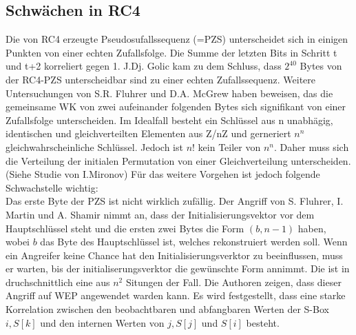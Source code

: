\documentclass[10pt,a4paper]{article}
\begin{document}
\subsection{Schwächen in RC4}
Die von RC4 erzeugte Pseudosufallssequenz (=PZS) unterscheidet sich in einigen Punkten von einer echten Zufallsfolge. Die Summe der letzten Bits in Schritt t und t+2 korreliert gegen 1.
J.Dj. Golic kam zu dem Schluss, dass $2^40$ Bytes von der RC4-PZS unterscheidbar sind zu einer echten Zufallssequenz.
Weitere Untersuchungen von S.R. Fluhrer und D.A. McGrew haben beweisen, das die gemeinsame WK von zwei aufeinander folgenden Bytes sich signifikant von einer Zufallsfolge unterscheiden. Im Idealfall besteht ein Schlüssel aus n unabhägig, identischen und gleichverteilten Elementen aus Z/nZ und gerneriert $n^n$ gleichwahrscheinliche Schlüssel. Jedoch ist $n!$ kein Teiler von $n^n$. Daher muss sich die Verteilung der initialen Permutation von einer Gleichverteilung unterscheiden. (Siehe Studie von I.Mironov)
Für das weitere Vorgehen ist jedoch folgende Schwachstelle wichtig:\\
Das erste Byte der PZS ist nicht wirklich zufällig. Der Angriff von S. Fluhrer, I. Martin und A. Shamir nimmt an, dass der Initialisierungsvektor vor dem Hauptschlüssel steht und die ersten zwei Bytes die Form $(b,n-1)$ haben, wobei $b$ das Byte des Hauptschlüssel ist, welches rekonstruiert werden soll. Wenn ein Angreifer keine Chance hat den Initialisierungsverktor zu beeinflussen, muss er warten, bis der initialiserungsverktor die gewünschte Form annimmt. Die ist in druchschnittlich eine aus $n^2$ Situngen der Fall. Die Authoren zeigen, dass dieser Angriff auf WEP angewendet warden kann.
Es wird festgestellt, dass eine starke Korrelation zwischen den beobachtbaren und abfangbaren Werten der S-Box $i, S[k]$ und den internen Werten von $j, S[j]$ und $S[i]$ besteht.
\end{document}
